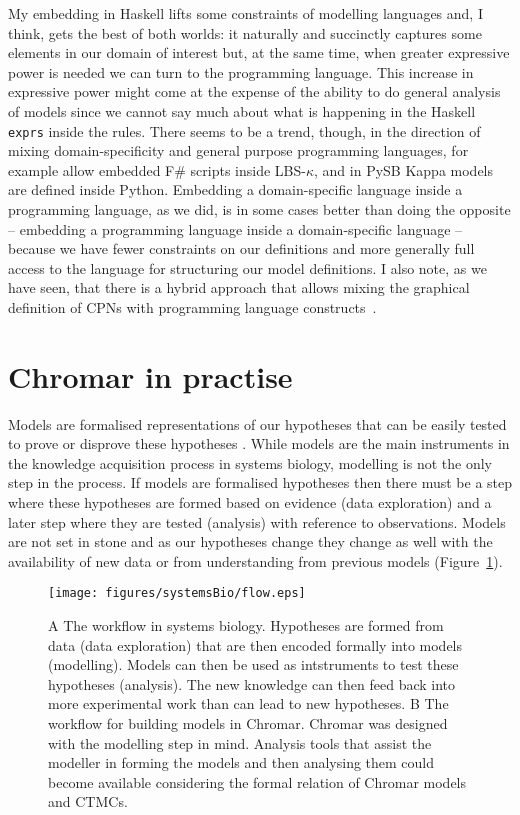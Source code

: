My embedding in Haskell lifts some constraints of modelling languages and, I
think, gets the best of both worlds: it naturally and succinctly captures some
elements in our domain of interest but, at the same time, when greater
expressive power is needed we can turn to the programming language. This
increase in expressive power might come at the expense of the ability to do
general analysis of models since we cannot say much about what is happening in
the Haskell \texttt{exprs} inside the rules. There seems to be a trend, though,
in the direction of mixing domain-specificity and general purpose programming
languages, for example \citet{pedersen_high-level_2015} allow embedded F\#
scripts inside LBS-$\kappa$, and in PySB \citep{lopez_programming_2013} Kappa
models are defined inside Python. Embedding a domain-specific language inside a
programming language, as we did, is in some cases better than doing the opposite
-- embedding a programming language inside a domain-specific language -- because
we have fewer constraints on our definitions and more generally full access to
the language for structuring our model definitions. I also note, as we have
seen, that there is a hybrid approach that allows mixing the graphical
definition of CPNs with programming language constructs~\citep[ML
language;][]{jensen_coloured_1987}.

\section{Chromar in practise}
Models are formalised representations of our hypotheses that can be easily
tested to prove or disprove these hypotheses
\citep{gunawardena_models_2014}. While models are the main instruments in the
knowledge acquisition process in systems biology, modelling is not the only step
in the process. If models are formalised hypotheses then there must be a step
where these hypotheses are formed based on evidence (data exploration) and a
later step where they are tested (analysis) with reference to
observations. Models are not set in stone and as our hypotheses change they
change as well with the availability of new data or from understanding from
previous models (Figure~\ref{fig:flowSystems}).

\begin{figure}
    \centering
    \texttt{[image: figures/systemsBio/flow.eps]}
    \caption{A The workflow in systems biology. Hypotheses are formed from data
      (data exploration) that are then encoded formally into models
      (modelling). Models can then be used as intstruments to test these
      hypotheses (analysis). The new knowledge can then feed back into more
      experimental work than can lead to new hypotheses. B The workflow for
      building models in Chromar. Chromar was designed with the modelling step
      in mind. Analysis tools that assist the modeller in forming the models and
      then analysing them could become available considering the formal relation
      of Chromar models and CTMCs.}
    \label{fig:flowSystems}
\end{figure}

